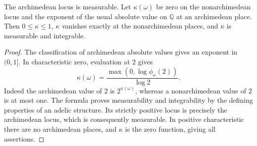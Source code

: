 \begin{lemma}\label{lem:archimedean-bound}
\leanok
{}
The archimedean locus is measurable. Let $\kappa(\omega)$ be zero on
the nonarchimedean locus and the exponent of the usual absolute value on
$\mathbb Q$ at an archimedean place. Then $0\leq\kappa\leq1$,
$\kappa$ vanishes exactly at the nonarchimedean places, and $\kappa$ is
measurable and integrable.
\end{lemma}
\begin{proof}
The classification of archimedean absolute values gives an exponent in
$(0,1]$. In characteristic zero, evaluation at $2$ gives
\[
 \kappa(\omega)=\frac{\max(0,\log\phi_\omega(2))}{\log2}.
\]
Indeed the archimedean value of $2$ is $2^{\kappa(\omega)}$, whereas a
nonarchimedean value of $2$ is at most one. The formula proves
measurability and integrability by the defining properties of an adelic
structure. Its strictly positive locus is precisely the archimedean locus,
which is consequently measurable. In positive characteristic there are no
archimedean places, and $\kappa$ is the zero function, giving all assertions.
\end{proof}
